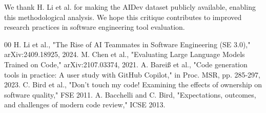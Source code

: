 \documentclass[conference]{IEEEtran}
\begin{document}
We thank H. Li et al. for making the AIDev dataset publicly available, enabling this methodological analysis. We hope this critique contributes to improved research practices in software engineering tool evaluation.

\balance
\begin{thebibliography}{00}
 H. Li et al., "The Rise of AI Teammates in Software Engineering (SE 3.0)," arXiv:2409.18925, 2024.
 M. Chen et al., "Evaluating Large Language Models Trained on Code," arXiv:2107.03374, 2021.
 A. Bareiß et al., "Code generation tools in practice: A user study with GitHub Copilot," in Proc. MSR, pp. 285-297, 2023.
 C. Bird et al., "Don't touch my code! Examining the effects of ownership on software quality," FSE 2011.
 A. Bacchelli and C. Bird, "Expectations, outcomes, and challenges of modern code review," ICSE 2013.
\end{thebibliography}
\end{document}
